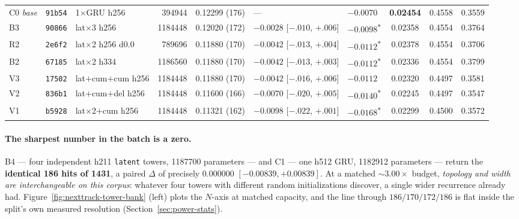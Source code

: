 \documentclass[11pt]{article}
\newcommand{\best}[1]{\textbf{#1}}
\begin{document}
\begin{table}[ht]
{\begin{tabular}{lllrlllccc}
    C0 \emph{base} & \texttt{91b54} & 1$\times$GRU h256 & \num{394944} & 0.12299 (176) & --- & $-0.0070$ & \best{0.02454} & 0.4558 & 0.3559 \\
    B3 & \texttt{90866} & lat$\times$3 h256 & \num{1184448} & 0.12020 (172) & $-0.0028$ [$-.010$, $+.006$] & $\mathbf{-0.0098}$\textsuperscript{$\ast$} & 0.02358 & 0.4554 & 0.3764 \\
    R2 & \texttt{2e6f2} & lat$\times$2 h256 d\num{0.0} & \num{789696} & 0.11880 (170) & $-0.0042$ [$-.013$, $+.004$] & $\mathbf{-0.0112}$\textsuperscript{$\ast$} & 0.02378 & 0.4554 & 0.3706 \\
    B2 & \texttt{67185} & lat$\times$2 h334 & \num{1186560} & 0.11880 (170) & $-0.0042$ [$-.013$, $+.003$] & $\mathbf{-0.0112}$\textsuperscript{$\ast$} & 0.02336 & 0.4554 & 0.3799 \\
    V3 & \texttt{17502} & lat$+$cum$+$cum h256 & \num{1184448} & 0.11880 (170) & $-0.0042$ [$-.016$, $+.006$] & $-0.0112$ & 0.02320 & 0.4497 & 0.3581 \\
    V2 & \texttt{836b1} & lat$+$cum$+$del h256 & \num{1184448} & 0.11600 (166) & $-0.0070$ [$-.020$, $+.005$] & $\mathbf{-0.0140}$\textsuperscript{$\ast$} & 0.02245 & 0.4497 & 0.3547 \\
    V1 & \texttt{b5928} & lat$\times$2$+$cum h256 & \num{1184448} & 0.11321 (162) & $-0.0098$ [$-.022$, $+.001$] & $\mathbf{-0.0168}$\textsuperscript{$\ast$} & 0.02299 & 0.4500 & 0.3572 \\
    \bottomrule
  \end{tabular}}
\end{table}

\paragraph{The sharpest number in the batch is a zero.} B4 --- four independent
h211 \texttt{latent} towers, \num{1187700} parameters --- and C1 --- one h512
GRU, \num{1182912} parameters --- return the \textbf{identical \num{186} hits of
\num{1431}}, a paired $\Delta$ of precisely $\num{0.000000}$
$[-\num{0.00839},+\num{0.00839}]$. At a matched ${\sim}\num{3.00}\times$ budget,
\emph{topology and width are interchangeable on this corpus}: whatever four
towers with different random initializations discover, a single wider recurrence
already had. Figure~\ref{fig:nexttrack-tower-bank} (left) plots the $N$-axis at
matched capacity, and the line through $\num{186}/\num{170}/\num{172}/\num{186}$
is flat inside the split's own measured resolution
(Section~\ref{sec:power-stats}).
\end{document}
